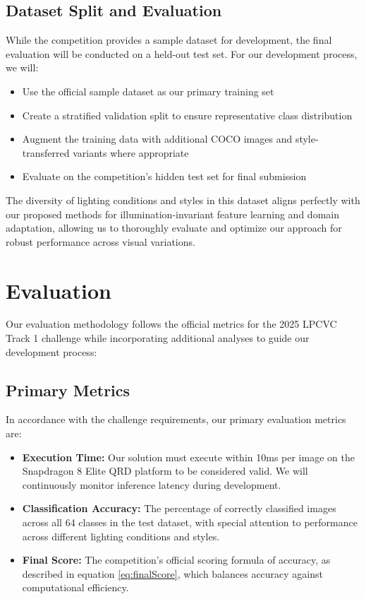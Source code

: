 \documentclass[11pt, oneside]{article}   	%
\begin{document}
\subsection*{Dataset Split and Evaluation}

While the competition provides a sample dataset for development, the final evaluation will be conducted on a held-out test set. For our development process, we will:

\begin{itemize}
	\item Use the official sample dataset as our primary training set
	\item Create a stratified validation split to ensure representative class distribution
	\item Augment the training data with additional COCO images and style-transferred variants where appropriate
	\item Evaluate on the competition's hidden test set for final submission
\end{itemize}

The diversity of lighting conditions and styles in this dataset aligns perfectly with our proposed methods for illumination-invariant feature learning and domain adaptation, allowing us to thoroughly evaluate and optimize our approach for robust performance across visual variations.

\section*{Evaluation}

Our evaluation methodology follows the official metrics for the 2025 LPCVC Track 1 challenge while incorporating additional analyses to guide our development process:

\subsection*{Primary Metrics}

In accordance with the challenge requirements, our primary evaluation metrics are:

\begin{itemize}
	\item \textbf{Execution Time:} Our solution must execute within 10ms per image on the Snapdragon 8 Elite QRD platform to be considered valid. We will continuously monitor inference latency during development.

	\item \textbf{Classification Accuracy:} The percentage of correctly classified images across all 64 classes in the test dataset, with special attention to performance across different lighting conditions and styles.

	\item \textbf{Final Score:} The competition's official scoring formula of accuracy, as described in equation \ref{eq:finalScore}, which balances accuracy against computational efficiency.
\end{itemize}
\end{document}
